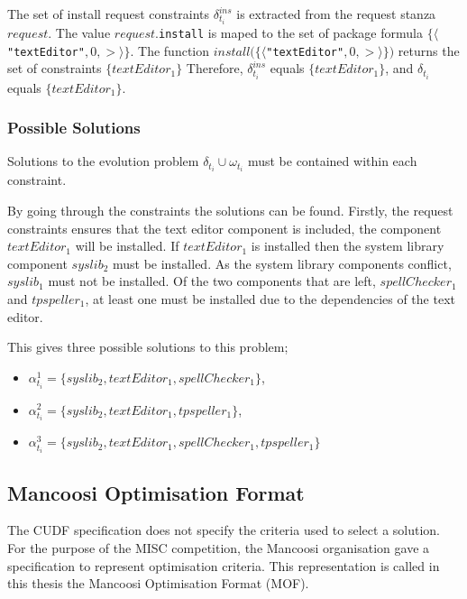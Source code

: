 The set of install request constraints $ \delta_{t_i}^{ins}$ is extracted from the request stanza $request$.
The value $request$.\texttt{install} is maped to the set of package formula $\{\langle $\verb+"textEditor"+$,0,>\rangle\}$.
The function $install(\{\langle $\verb+"textEditor"+$,0,>\rangle\})$ returns the set of constraints $\{textEditor_1\}$
Therefore, $\delta_{t_i}^{ins}$ equals $\{textEditor_1\}$, and $\delta_{t_i}$ equals $\{textEditor_1\}$.

\subsubsection{Possible Solutions}
Solutions to the evolution problem $\delta_{t_i} \cup \omega_{t_i}$ must be contained within each constraint.

By going through the constraints the solutions can be found.
Firstly, the request constraints ensures that the text editor component is included, the component $textEditor_1$ will be installed.
If $textEditor_1$ is installed then the system library component $syslib_2$ must be installed.
As the system library components conflict, $syslib_1$ must not be installed.
Of the two components that are left, $spellChecker_1$ and $tpspeller_1$, at least one must be installed due to the dependencies of the text editor.

This gives three possible solutions to this problem;
\begin{itemize}
  \item $\alpha_{t_i}^1 = \{syslib_2, textEditor_1, spellChecker_1\}$,
  \item $\alpha_{t_i}^2 = \{syslib_2, textEditor_1, tpspeller_1\}$,
  \item $\alpha_{t_i}^3 = \{syslib_2, textEditor_1, spellChecker_1, tpspeller_1\}$
\end{itemize}

\subsection{Mancoosi Optimisation Format}
\label{formal.mancoosioptimisationformat}
The CUDF specification does not specify the criteria used to select a solution.
For the purpose of the MISC competition, the Mancoosi organisation gave a specification to represent optimisation criteria.
This representation is called in this thesis the Mancoosi Optimisation Format (MOF).

